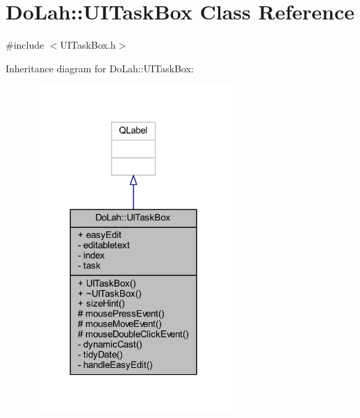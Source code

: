 \hypertarget{class_do_lah_1_1_u_i_task_box}{}\section{Do\+Lah\+:\+:U\+I\+Task\+Box Class Reference}
\label{class_do_lah_1_1_u_i_task_box}


{\ttfamily \#include $<$U\+I\+Task\+Box.\+h$>$}



Inheritance diagram for Do\+Lah\+:\+:U\+I\+Task\+Box\+:
\nopagebreak
\begin{figure}[H]
\begin{center}
\leavevmode
\includegraphics[width=216pt]{class_do_lah_1_1_u_i_task_box__inherit__graph}
\end{center}
\end{figure}


